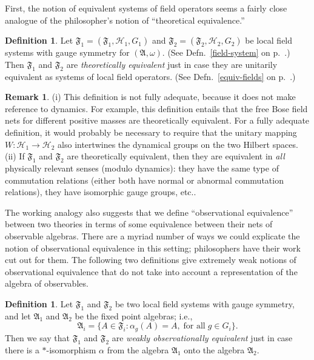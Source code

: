 \documentclass[12pt]{article}
\newcommand{\alg}[1]{\mathfrak{#1}}
\theoremstyle{definition}
\theoremstyle{definition}
\newtheorem{defn}[thm]{Definition}
\newtheorem{rema}[thm]{Remark}
\theoremstyle{remark}
\def\2#1{{\mathcal #1}}
\def\al#1{{\mathfrak #1}}
\def\a{\alpha} \def\b{\beta} \def\g{\gamma} \def\d{\delta}
\def\om{\omega} \def\Om{\Omega} \def\dd{\partial} \def\D{\Delta}
\begin{document}
First, the notion of equivalent systems of field operators seems a
fairly close analogue of the philosopher's notion of ``theoretical
equivalence.''
\begin{defn} Let $\alg{F}_1=(\alg{F}_1,\2H_1,G _1)$ and
  $\alg{F}_2=(\alg{F}_2,\2H_2,G_2)$ be local field systems with gauge
  symmetry for $(\al A,\om )$.  (See Defn.\ \ref{field-system} on p.\
  \pageref{field-system}.) Then $\alg{F}_1$ and $\alg{F}_2$ are
  \emph{theoretically equivalent} just in case they are unitarily
  equivalent as systems of local field operators.  (See Defn.\
  \ref{equiv-fields} on p.\ \pageref{equiv-fields}.)  \end{defn}

\begin{rema} (i) This definition is not fully adequate, because it
  does not make reference to dynamics.  For example, this definition
  entails that the free Bose field nets for different positive masses
  are theoretically equivalent.  For a fully adequate definition, it
  would probably be necessary to require that the unitary mapping
  $W:\2H _1\to \2H _2$ also intertwines the dynamical groups on the
  two Hilbert spaces. (ii) If $\al F_1$ and $\al F_2$ are
  theoretically equivalent, then they are equivalent in \emph{all}
  physically relevant senses (modulo dynamics): they have the same
  type of commutation relations (either both have normal or abnormal
  commutation relations), they have isomorphic gauge groups, etc..
\end{rema}



The working analogy also suggests that we define ``observational
equivalence'' between two theories in terms of some equivalence
between their nets of observable algebras.  There are a myriad number
of ways we could explicate the notion of observational equivalence in
this setting; philosophers have their work cut out for them.  The
following two definitions give extremely weak notions of observational
equivalence that do not take into account a representation of the
algebra of observables.

\begin{defn}
  Let $\al F_1$ and $\al F_2$ be two local field systems with gauge
  symmetry, and let $\al A_1$ and $\al A_2$ be the fixed point
  algebras; i.e., 
$$ \al A_i =\{ A\in \al F_i :\a _g(A)=A,\; \mbox{for all}\; g\in
G_i \} .$$ Then we say that $\al F_1$ and $\al F_2$ are \emph{weakly
  observationally equivalent} just in case there is a $*$-isomorphism
$\a$ from the algebra $\al A_1$ onto the algebra $\al A_2$.
\end{defn}
\end{document}
